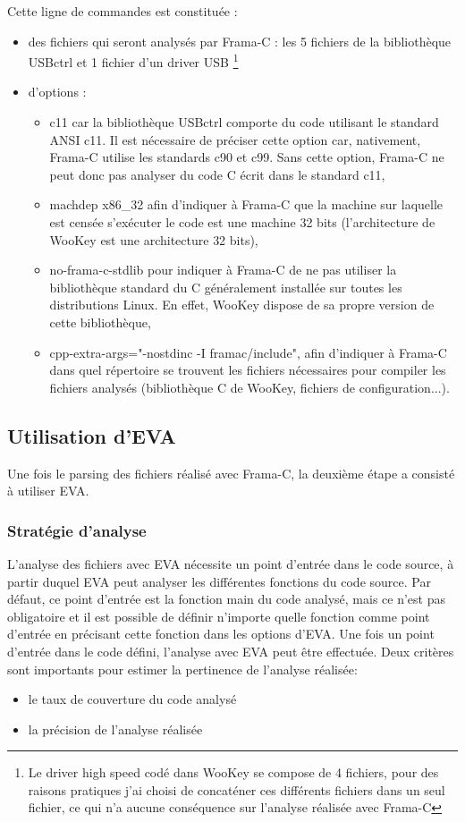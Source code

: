 \noindent Cette ligne de commandes est constituée :
\begin{itemize}
	\item des fichiers qui seront analysés par Frama-C : les 5 fichiers de la bibliothèque USBctrl et 1 fichier d'un driver USB \footnote{Le driver high speed codé dans WooKey se compose de 4 fichiers, pour des raisons pratiques j'ai choisi de concaténer ces différents fichiers dans un seul fichier, ce qui n'a aucune conséquence sur l'analyse réalisée avec Frama-C}
	\item d'options :
		\begin{itemize}
			\item c11 car la bibliothèque USBctrl comporte du code utilisant le standard ANSI c11. Il est nécessaire de préciser cette option car, nativement, Frama-C utilise les standards c90 et c99. Sans cette option, Frama-C ne peut donc pas analyser du code C écrit dans le standard c11,
			\item machdep x86\_32 afin d'indiquer à Frama-C que la machine sur laquelle est censée s'exécuter le code est une machine 32 bits (l'architecture de WooKey est une architecture 32 bits),
			\item no-frama-c-stdlib pour indiquer à Frama-C de ne pas utiliser la bibliothèque standard du C généralement installée sur toutes les distributions Linux. En effet, WooKey dispose de sa propre version de cette bibliothèque,
			\item cpp-extra-args="-nostdinc -I framac/include", afin d'indiquer à Frama-C dans quel répertoire se trouvent les fichiers nécessaires pour compiler les fichiers analysés (bibliothèque C de WooKey, fichiers de configuration...).
		\end{itemize}
\end{itemize}

\subsection{Utilisation d'EVA}

Une fois le parsing des fichiers réalisé avec Frama-C, la deuxième étape a consisté à utiliser EVA.

\subsubsection{Stratégie d'analyse}

L'analyse des fichiers avec EVA nécessite un point d'entrée dans le code source, à partir duquel EVA peut analyser les différentes fonctions du code source. Par défaut, ce point d'entrée est la fonction main du code analysé, mais ce n'est pas obligatoire et il est possible de définir n'importe quelle fonction comme point d'entrée en précisant cette fonction dans les options d'EVA. Une fois un point d'entrée dans le code défini, l'analyse avec EVA peut être effectuée. Deux critères sont importants pour estimer la pertinence de l'analyse réalisée:
\begin{itemize}
	\item le taux de couverture du code analysé
	\item la précision de l'analyse réalisée
\end{itemize}

